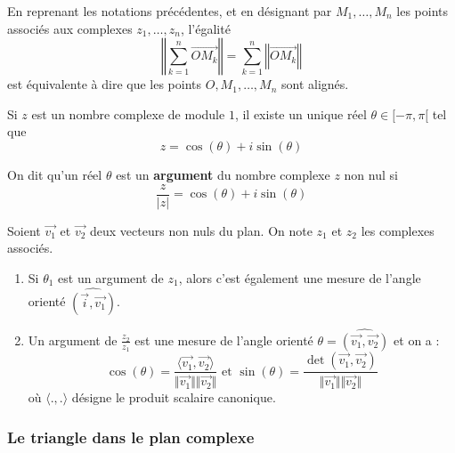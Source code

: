   \begin{remark}
    En reprenant les notations précédentes, et en désignant par $M_1, \dots, M_n$ les points associés aux complexes $z_1, \dots, z_n$, l'égalité
    \[ \left\Vert \sum_{k=1}^n \overrightarrow{OM_k} \right\Vert = \sum_{k=1}^n \left\Vert \overrightarrow{OM_k} \right\Vert \]
    est équivalente à dire que les points $O, M_1, \dots, M_n$ sont alignés.
  \end{remark}

  \begin{theorem}
    Si $z$ est un nombre complexe de module $1$, il existe un unique réel $\theta \in [-\pi, \pi[$ tel que
    \[ z = \cos(\theta) + i\sin(\theta) \]
  \end{theorem}

  \begin{definition}
    On dit qu'un réel $\theta$ est un \textbf{argument} du nombre complexe $z$ non nul si
    \[ \frac{z}{\vert z \vert} = \cos(\theta) + i\sin(\theta) \]
  \end{definition}

  \begin{theorem}
    Soient $\overrightarrow{v_1}$ et $\overrightarrow{v_2}$ deux vecteurs non nuls du plan. On note $z_1$ et $z_2$ les complexes associés.
    \begin{enumerate}[label=(\roman*)]
      \item Si $\theta_1$ est un argument de $z_1$, alors c'est également une mesure de l'angle orienté $\widehat{(\overrightarrow{i}, \overrightarrow{v_1})}$.
      \item Un argument de $\frac{z_2}{z_1}$ est une mesure de l'angle orienté $\theta = \widehat{(\overrightarrow{v_1}, \overrightarrow{v_2})}$ et on a :
      \[ \cos(\theta) = \frac{\langle \overrightarrow{v_1}, \overrightarrow{v_2} \rangle}{\Vert \overrightarrow{v_1} \Vert \Vert \overrightarrow{v_2} \Vert} \text{ et } \sin(\theta) = \frac{\det \left( \overrightarrow{v_1}, \overrightarrow{v_2} \right)}{\Vert \overrightarrow{v_1} \Vert \Vert \overrightarrow{v_2} \Vert} \]
      où $\langle ., . \rangle$ désigne le produit scalaire canonique.
    \end{enumerate}
  \end{theorem}

  \subsubsection{Le triangle dans le plan complexe}

